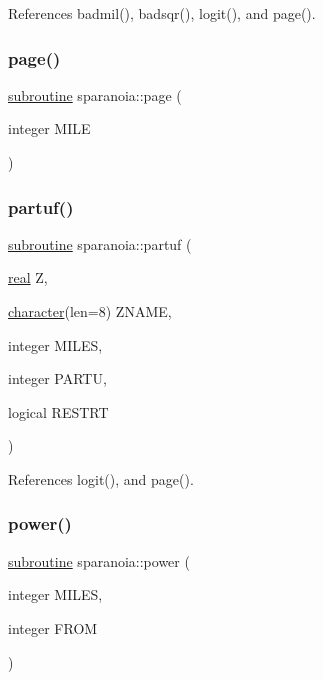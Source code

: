 References badmil(), badsqr(), logit(), and page().

\mbox{\label{sparanoia_8f90_a163adc8cbfccbae31bb2adb72adeb9b0}} 
\subsubsection{\texorpdfstring{page()}{page()}}
{\footnotesize\ttfamily \hyperlink{M__stopwatch_83_8txt_acfbcff50169d691ff02d4a123ed70482}{subroutine} sparanoia\+::page (\begin{DoxyParamCaption}\item[{integer}]{M\+I\+LE }\end{DoxyParamCaption})}

\mbox{\label{sparanoia_8f90_ab742eeb0cdf95dcdf1340960ce387095}} 
\subsubsection{\texorpdfstring{partuf()}{partuf()}}
{\footnotesize\ttfamily \hyperlink{M__stopwatch_83_8txt_acfbcff50169d691ff02d4a123ed70482}{subroutine} sparanoia\+::partuf (\begin{DoxyParamCaption}\item[{\hyperlink{read__watch_83_8txt_abdb62bde002f38ef75f810d3a905a823}{real}}]{Z,  }\item[{\hyperlink{option__stopwatch_83_8txt_abd4b21fbbd175834027b5224bfe97e66}{character}(len=8)}]{Z\+N\+A\+ME,  }\item[{integer}]{M\+I\+L\+ES,  }\item[{integer}]{P\+A\+R\+TU,  }\item[{logical}]{R\+E\+S\+T\+RT }\end{DoxyParamCaption})}



References logit(), and page().

\mbox{\label{sparanoia_8f90_aa0f6d55a5569e0c070c918b0716dc073}} 
\subsubsection{\texorpdfstring{power()}{power()}}
{\footnotesize\ttfamily \hyperlink{M__stopwatch_83_8txt_acfbcff50169d691ff02d4a123ed70482}{subroutine} sparanoia\+::power (\begin{DoxyParamCaption}\item[{integer}]{M\+I\+L\+ES,  }\item[{integer}]{F\+R\+OM }\end{DoxyParamCaption})}



